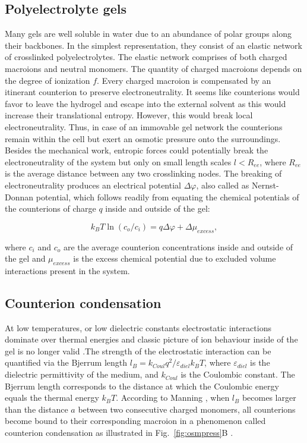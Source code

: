 \documentclass[twoside,twocolumn,9pt]{article}
\begin{document}
\subsection{Polyelectrolyte gels}

Many gels are well soluble in water due to an abundance of polar groups along their backbones. In the simplest representation, they consist of an elastic network of crosslinked polyelectrolytes. The elastic network comprises of both charged macroions and neutral monomers. The quantity of charged macroions depends on the degree of ionization $f$. Every charged macroion is compensated by an itinerant counterion to preserve electroneutrality. It seems like counterions would favor to leave the hydrogel and escape into the external solvent as this would increase their translational entropy. However, this would break local electroneutrality. Thus, in case of an immovable gel network the counterions remain within the cell but exert an osmotic pressure onto the surroundings. Besides the mechanical work, entropic forces could potentially break the electroneutrality of the system but only on small length scales $l < R_{ee}$, where $R
_{ee}$ is the average distance between any two crosslinking nodes. The breaking of electroneutrality produces an electrical potential $\Delta \varphi$, also called as Nernst-Donnan potential, which follows readily from equating the chemical potentials of the counterions of charge $q$ inside and outside of the gel:

\begin{equation}\label{eq:donnanpotential}
k_B T \ln (c_o/c_i)= q \Delta \varphi + \Delta \mu_{excess} ,
\end{equation}

where $c_i$ and $c_o$ are the average counterion concentrations inside and outside of the gel and $\mu_{excess}$ is the excess chemical potential due to excluded volume interactions present in the system.



\subsection{Counterion condensation}

At low temperatures, or low dielectric constants electrostatic interactions dominate over thermal energies and classic picture of ion behaviour inside of the gel is no longer valid \cite{Osada2002}.The strength of the electrostatic interaction can be quantified via the Bjerrum length $l_B = k_{Coul} q^2/\varepsilon_{diel} k_B T$, where $\varepsilon_{diel}$ is the dielectric permittivity of the medium, and $k_{Coul}$ is the Coulombic constant. The Bjerrum length corresponds to the distance at which the Coulombic energy equals the thermal energy $k_BT$. According to Manning \cite{Manning_1977}, when $l_B$ becomes larger than the distance $a$ between two consecutive charged monomers, all counterions become bound to their corresponding macroion in a phenomenon called counterion condensation as illustrated in Fig.~\ref{fig:osmpress}B \cite{Mann2005}.
\end{document}
